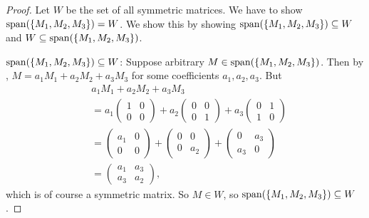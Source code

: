 \begin{proof}
Let \(W\) be the set of all symmetric matrices.
We have to show \(\operatorname{span}(\{M_1, M_2, M_3\}) = W\).
We show this by showing \(\operatorname{span}(\{M_1, M_2, M_3\}) \subseteq W\) and \(W \subseteq \operatorname{span}(\{M_1, M_2, M_3\})\).

\(\operatorname{span}(\{M_1, M_2, M_3\}) \subseteq W\): Suppose arbitrary \(M \in \operatorname{span}(\{M_1, M_2, M_3\})\).
Then by , \(M = a_1 M_1 + a_2 M_2 + a_3 M_3\) for some coefficients \(a_1, a_2, a_3\).
But
\begin{align*}
     & a_1 M_1 + a_2 M_2 + a_3 M_3 \\
     & = a_1 \begin{pmatrix}
            1 & 0 \\
            0 & 0
        \end{pmatrix}
        + a_2 \begin{pmatrix}
            0 & 0 \\
            0 & 1
        \end{pmatrix}
        + a_3 \begin{pmatrix}
            0 & 1 \\
            1 & 0
        \end{pmatrix} \\
    & = \begin{pmatrix}
            a_1 & 0 \\
            0 & 0
        \end{pmatrix}
        + \begin{pmatrix}
            0 & 0 \\
            0 & a_2
        \end{pmatrix}
        + \begin{pmatrix}
            0 & a_3 \\
            a_3 & 0
        \end{pmatrix} \\
    & = \begin{pmatrix}
            a_1 & a_3 \\
            a_3 & a_2
        \end{pmatrix},
\end{align*}
which is of course a symmetric matrix.
So \(M \in W\), so \(\operatorname{span}(\{M_1, M_2, M_3\}) \subseteq W\).


\end{proof}

